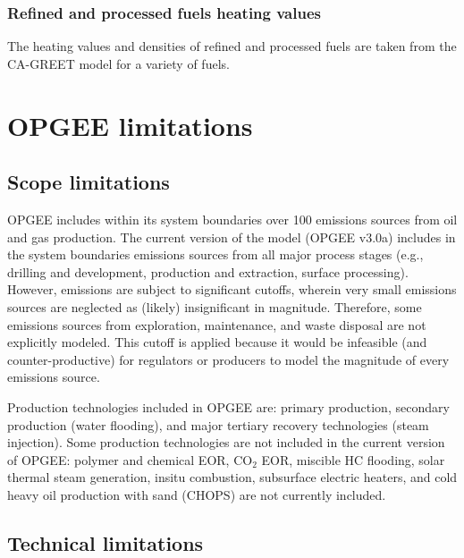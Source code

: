 \documentclass[11pt]{report}
\newcommand{\marg}[1]{{\footnotesize\textit{\textcolor{stanford}{'#1'}}}}
\newcommand{\marginnote}[1]{\marginpar{\marg{#1}}}
\newcommand{\version}{v3.0a}
\begin{document}
{{{{\subsection{Refined and processed fuels heating values}

The \marginnote{Fuel Specs Table 4.1} heating values and densities of refined and processed fuels are taken from the CA-GREET model \cite{Wang2009} for a variety of fuels. 




\chapter{OPGEE limitations}




\section{Scope limitations}

OPGEE includes within its system boundaries over 100 emissions sources from oil and gas production. The current version of the model (OPGEE \version) includes in the system boundaries emissions sources from all major process stages (e.g., drilling and development, production and extraction, surface processing). However, emissions are subject to significant cutoffs, wherein very small emissions sources are neglected as (likely) insignificant in magnitude. Therefore, some emissions sources from exploration, maintenance, and waste disposal are not explicitly modeled. This cutoff is applied because it would be infeasible (and counter-productive) for regulators or producers to model the magnitude of every emissions source.

Production technologies included in OPGEE are: primary production, secondary production (water flooding), and major tertiary recovery technologies (steam injection). Some production technologies are not included in the current version of OPGEE: polymer and chemical EOR, CO$_2$ EOR, miscible HC flooding, solar thermal steam generation, insitu combustion, subsurface electric heaters, and cold heavy oil production with sand (CHOPS) are not currently included.




\section{Technical limitations}
}}}}
\end{document}
